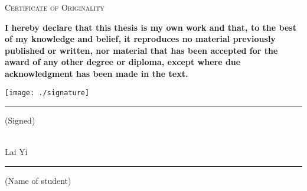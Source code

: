 \vspace{5cm}

\begin{center}
\textsc{\LARGE Certificate of Originality}
\end{center}

\vspace{2cm}
{\Large \bfseries I hereby declare that this thesis is my own work and that, to the best of my knowledge and belief, it reproduces no material previously published or written, nor material that has been accepted for the award of any other degree or diploma, except where due acknowledgment has been made in the text.}

\vfill

\begin{flushleft}
\texttt{[image: ./signature]} \\
{\Large \bfseries \rule{8cm}{0.4pt} (Signed)}
\\[2cm]
{\Large Lai Yi} \\
{\Large \bfseries \rule{8cm}{0.4pt} (Name of student)}
\end{flushleft}
